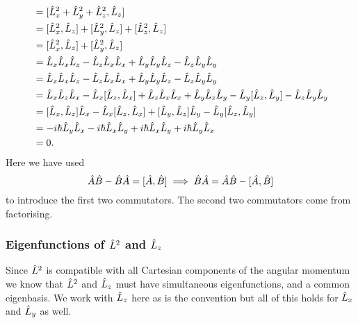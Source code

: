 \documentclass[a4paper]{article}
\theoremstyle{definition}
\begin{document}
    \begin{align*}
        [\operator{L}^2, \operator{L}_z] &= [\operator{L}_x^2 + \operator{L}_y^2 + \operator{L}_z^2, \operator{L}_z]\\
        &= [\operator{L}_x^2, \operator{L}_z] + [\operator{L}_y^2, \operator{L}_z] + [\operator{L}_z^2, \operator{L}_z]\\
        &= [\operator{L}_x^2, \operator{L}_z] + [\operator{L}_y^2, \operator{L}_z]\\
        &= \operator{L}_x\operator{L}_x\operator{L}_z - \operator{L}_z\operator{L}_x\operator{L}_x + \operator{L}_y\operator{L}_y\operator{L}_z - \operator{L}_z\operator{L}_y\operator{L}_y\\
        &= \operator{L}_x\operator{L}_x\operator{L}_z - \operator{L}_z\operator{L}_x\operator{L}_x + \operator{L}_y\operator{L}_y\operator{L}_z - \operator{L}_z\operator{L}_y\operator{L}_y\\
        &= \operator{L}_x\operator{L}_z\operator{L}_x - \operator{L}_x[\operator{L}_z, \operator{L}_x] + \operator{L}_z\operator{L}_x\operator{L}_x + \operator{L}_y\operator{L}_z\operator{L}_y - \operator{L}_y[\operator{L}_z, \operator{L}_y] - \operator{L}_z\operator{L}_y\operator{L}_y\\
        &= [\operator{L}_x, \operator{L}_z]\operator{L}_x - \operator{L}_x[\operator{L}_z, \operator{L}_x] + [\operator{L}_y, \operator{L}_z]\operator{L}_y - \operator{L}_y[\operator{L}_z, \operator{L}_y]\\
        &= -i\hbar\operator{L}_y\operator{L}_x - i\hbar\operator{L}_x\operator{L}_y + i\hbar\operator{L}_x\operator{L}_y + i\hbar\operator{L}_y\operator{L}_x\\
        &= 0.
    \end{align*}
    Here we have used
    \[\hat{A}\hat{B} - \hat{B}\hat{A} = [\hat{A}, \hat{B}] \implies \hat{B}\hat{A} = \hat{A}\hat{B} - [\hat{A}, \hat{B}]\]
    to introduce the first two commutators.
    The second two commutators come from factorising.
    
    \subsubsection{Eigenfunctions of \texorpdfstring{\(\hat{L}^2\)}{Lsquared} and \texorpdfstring{\(\hat{L}_z\)}{Lz}}
    Since \(\hat{L}^2\) is compatible with all Cartesian components of the angular momentum we know that \(\hat{L}^2\) and \(\hat{L}_z\) must have simultaneous eigenfunctions, and a common eigenbasis.
    We work with \(\hat{L}_z\) here as is the convention but all of this holds for \(\hat{L}_x\) and \(\hat{L}_y\) as well.
    
\end{document}
